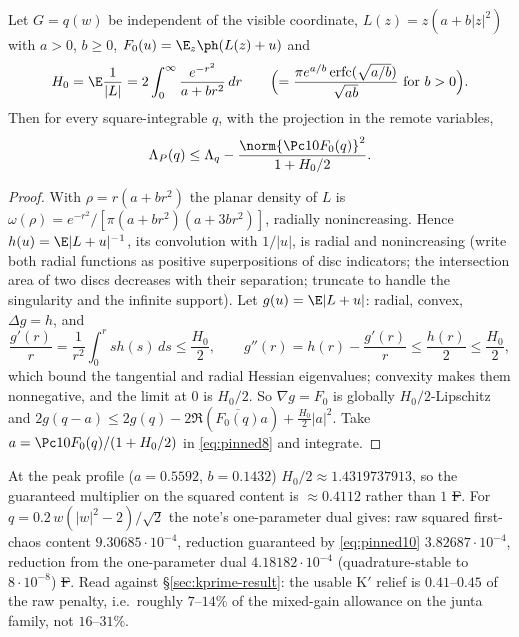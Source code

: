\begin{theorem}\label{thm:qpenalty}
Let $G=q(w)$ be independent of the visible coordinate, $L(z)=z(a+b|z|^2)$ with $a>0$, $b\ge0$, $F_0(u)=\E_z\ph(L(z)+u)$ and
\[
H_0=\E\frac1{|L|}=2\int_0^\infty\frac{e^{-r^2}}{a+br^2}\,dr\qquad\Bigl(=\frac{\pi e^{a/b}\operatorname{erfc}(\sqrt{a/b})}{\sqrt{ab}}\ \text{for }b>0\Bigr).
\]
Then for every square-integrable $q$, with the projection in the remote variables,
\begin{equation}\label{eq:pinned10}
\Lambda_P(q)\le\Lambda_q-\frac{\norm{\Pc10F_0(q)}^2}{1+H_0/2}.
\end{equation}
\end{theorem}
\begin{proof}With $\rho=r(a+br^2)$ the planar density of $L$ is $\omega(\rho)=e^{-r^2}/[\pi(a+br^2)(a+3br^2)]$, radially nonincreasing. Hence $h(u)=\E|L+u|^{-1}$, its convolution with
$1/|u|$, is radial and nonincreasing (write both radial functions as positive superpositions of disc indicators; the intersection area of two discs decreases with their separation;
truncate to handle the singularity and the infinite support). Let $g(u)=\E|L+u|$: radial, convex, $\Delta g=h$, and
\[
\frac{g'(r)}r=\frac1{r^2}\int_0^rsh(s)\,ds\le\frac{H_0}2,\qquad g''(r)=h(r)-\frac{g'(r)}r\le\frac{h(r)}2\le\frac{H_0}2 ,
\]
which bound the tangential and radial Hessian eigenvalues; convexity makes them nonnegative, and the limit at $0$ is $H_0/2$. So $\nabla g=F_0$ is globally $H_0/2$-Lipschitz and
$2g(q-a)\le2g(q)-2\Re(\overline{F_0(q)}a)+\frac{H_0}2|a|^2$. Take $a=\Pc10F_0(q)/(1+H_0/2)$ in \eqref{eq:pinned8} and integrate.\end{proof}
At the peak profile ($a=0.5592$, $b=0.1432$) $H_0/2\approx1.4319737913$, so the guaranteed multiplier on the squared content is $\approx0.4112$ rather than $1$ \st{F}. For
$q=0.2\,w(|w|^2-2)/\sqrt2$ the note's one-parameter dual gives: raw squared first-chaos content $9.30685\cdot10^{-4}$, reduction guaranteed by \eqref{eq:pinned10} $3.82687\cdot10^{-4}$, reduction
from the one-parameter dual $4.18182\cdot10^{-4}$ (quadrature-stable to $8\cdot10^{-8}$) \st{F}. Read against \S\ref{sec:kprime-result}: the usable K$'$ relief is $0.41$--$0.45$ of the raw
penalty, i.e.\ roughly $7$--$14\%$ of the mixed-gain allowance on the junta family, not $16$--$31\%$.

